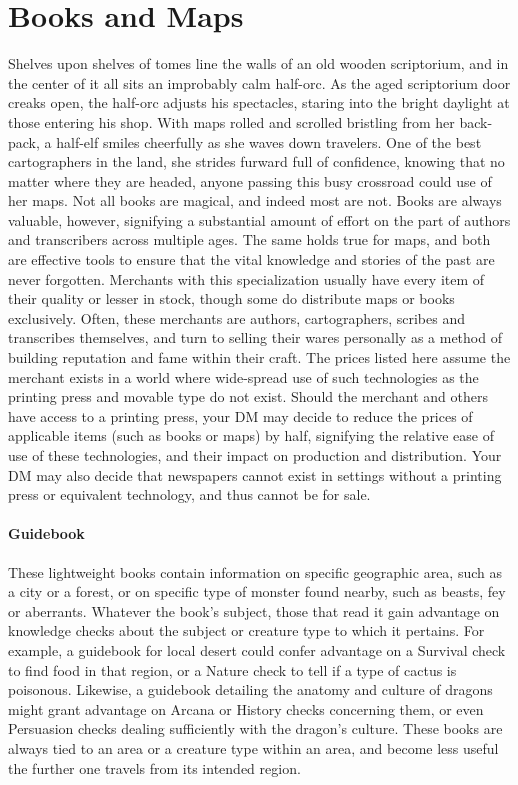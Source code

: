 \documentclass[10pt,a4paper,twoside,twocolumn,openany,nodeprecatedcode,bg=print]{dndbook}
\begin{document}
\section{Books and Maps}
Shelves upon shelves of tomes line the walls of an old wooden scriptorium, and in the center of it all sits an improbably calm half-orc. As the aged scriptorium door creaks open, the half-orc adjusts his spectacles, staring into the bright daylight at those entering his shop.
With maps rolled and scrolled bristling from her back-pack, a half-elf smiles cheerfully as she waves down travelers. One of the best cartographers in the land, she strides furward full of confidence, knowing that no matter where they are headed, anyone passing this busy crossroad could use of her maps.
Not all books are magical, and indeed most are not. Books are always valuable, however, signifying a substantial amount of effort on the part of authors and transcribers across multiple ages. The same holds true for maps, and both are effective tools to ensure that the vital knowledge and stories of the past are never forgotten.
Merchants with this specialization usually have every item of their quality or lesser in stock, though some do distribute maps or books exclusively. Often, these merchants are authors, cartographers, scribes and transcribes themselves, and turn to selling their wares personally as a method of building reputation and fame within their craft.
The prices listed here assume the merchant exists in a world where wide-spread use of such technologies as the printing press and movable type do not exist. Should the merchant and others have access to a printing press, your DM may decide to reduce the prices of applicable items (such as books or maps) by half, signifying the relative ease of use of these technologies, and their impact on production and distribution. Your DM may also decide that newspapers cannot exist in settings without a printing press or equivalent technology, and thus cannot be for sale.

\paragraph{Guidebook}
These lightweight books contain information on specific geographic area, such as a city or a forest, or on specific type of monster found nearby, such as beasts, fey or aberrants. Whatever the book's subject, those that read it gain advantage on knowledge checks about the subject or creature type to which it pertains. For example, a guidebook for local desert could confer advantage on a Survival check to find food in that region, or a Nature check to tell if a type of cactus is poisonous. Likewise, a guidebook detailing the anatomy and culture of dragons might grant advantage on Arcana or History checks concerning them, or even Persuasion checks dealing sufficiently with the dragon's culture. These books are always tied to an area or a creature type within an area, and become less useful the further one travels from its intended region.
\end{document}
